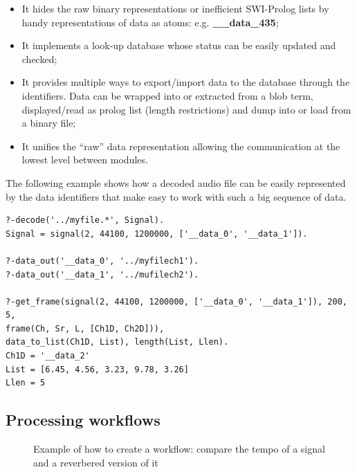 \documentclass[runningheads]{llncs}
\begin{document}
\begin{itemize}
 \item It hides the raw binary representations or inefficient SWI-Prolog lists by handy representations of data as atoms: e.g. \textbf{\_\_data\_435};
 \item It implements a look-up database whose status can be easily updated and checked;
 \item It provides multiple ways to export/import data to the database through the identifiers. Data can be wrapped into or extracted from a blob term, displayed/read as prolog list (length restrictions) and dump into or load from a binary file;
 \item It unifies the ``raw'' data representation allowing the communication at the lowest level between modules.
\end{itemize}

The following example shows how a decoded audio file can be easily represented by the data identifiers that make easy to work with such a big sequence of data.
\begin{verbatim}
?-decode('../myfile.*', Signal).
Signal = signal(2, 44100, 1200000, ['__data_0', '__data_1']).

?-data_out('__data_0', '../myfilech1').
?-data_out('__data_1', '../mufilech2').

?-get_frame(signal(2, 44100, 1200000, ['__data_0', '__data_1']), 200, 5,
frame(Ch, Sr, L, [Ch1D, Ch2D])),
data_to_list(Ch1D, List), length(List, Llen).
Ch1D = '__data_2'
List = [6.45, 4.56, 3.23, 9.78, 3.26]
Llen = 5
\end{verbatim}

\subsection{Processing workflows}\label{subsec:worflow}

\begin{figure}
\centerline{}
\caption{Example of how to create a workflow: compare the tempo of a signal and a reverbered version of it}
\label{fig:workflow}
\end{figure}
\end{document}
